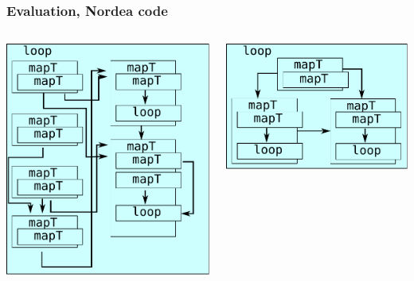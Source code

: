 \documentclass{beamer}
\begin{document}
\begin{frame}
  \frametitle{Evaluation, Nordea code}

\begin{columns}
\begin{column}{0.4\textwidth}
  \includegraphics[width=\textwidth]{img/HiperfitEgCos-unfused.pdf}
\end{column}
\begin{column}{0.4\textwidth}
  \includegraphics[width=\textwidth]{img/HiperfitEgCos-fused.pdf}
\end{column}
\end{columns}


\end{frame}
\end{document}
